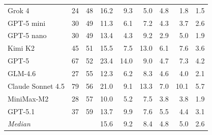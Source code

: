 \begin{tabular}{@{}l r r rr rr rr@{}}
Grok 4                         & 24 & 48 & 16.2 & 9.3 & 5.0 & 4.8 & 1.8 & 1.5 \\
GPT-5 mini                     & 30 & 49 & 11.3 & 6.1 & 7.2 & 4.3 & 3.7 & 2.6 \\
GPT-5 nano                     & 30 & 49 & 13.4 & 4.3 & 9.2 & 2.9 & 5.0 & 1.9 \\
Kimi K2                        & 45 & 51 & 15.5 & 7.5 & 13.0 & 6.1 & 7.6 & 3.6 \\
GPT-5                          & 67 & 52 & 23.4 & 14.0 & 9.0 & 4.7 & 7.3 & 4.2 \\
GLM-4.6                        & 27 & 55 & 12.3 & 6.2 & 8.3 & 4.6 & 4.0 & 2.1 \\
Claude Sonnet 4.5              & 79 & 56 & 21.0 & 9.1 & 13.3 & 7.0 & 10.1 & 5.7 \\
MiniMax-M2                     & 28 & 57 & 10.0 & 5.2 & 7.5 & 3.8 & 3.8 & 1.9 \\
GPT-5.1                        & 37 & 59 & 13.7 & 9.9 & 7.6 & 5.5 & 4.4 & 3.1 \\
\midrule
\textit{Median}          &    &    & 15.6 & 9.2 & 8.4 & 4.8 & 5.0 & 2.6 \\
\bottomrule
\end{tabular}
